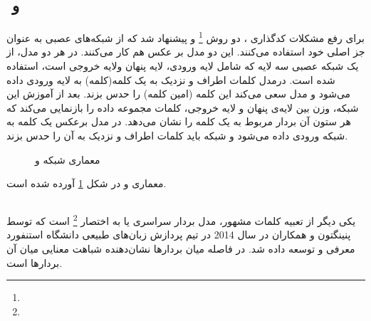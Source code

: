 \subsection{‌ و }
	برای رفع مشکلات کدگذاری 
	، دو روش
	\footnote{}
	\cite{mikolov2013efficient}
	و
	\cite{mikolov2013efficient}
	پیشنهاد شد که از شبکه‌های عصبی به عنوان جز اصلی خود استفاده می‌کنند. این دو مدل بر عکس هم کار می‌کنند.	در هر دو مدل، از یک شبکه عصبی سه لایه که شامل لایه ورودی، لایه پنهان ولایه خروجی است، استفاده شده است. درمدل 
	کلمات اطراف و نزدیک به یک کلمه(کلمه) به لایه ورودی داده می‌شود و مدل سعی می‌کند این کلمه (امین کلمه) را حدس بزند.  بعد از آموزش این شبکه‌، وزن بین لایه‌ی پنهان و لایه خروجی، کلمات مجموعه داده را بازنمایی می‌کند که هر ستون آن بردار مربوط به یک کلمه را نشان می‌دهد. در مدل
	برعکس 
	یک کلمه به شبکه ورودی داده می‌شود و شبکه باید کلمات اطراف و نزدیک به آن را حدس بزند. 
	\begin{figure}
		\caption{
			معماری شبکه 
			و
		}
		\label{fig:CBOW&skip-gram}
	\end{figure}
	معماری 
	و
	در شکل 
	\ref{fig:CBOW&skip-gram}
	آورده شده است. 

\subsection{}
	یکی دیگر از تعبیه کلمات مشهور، مدل بردار سراسری یا به اختصار 
	\footnote{}
	است که توسط پنینگتون و همکاران 
	\cite{pennington2014glove}
	در سال 2014 در تیم پردازش زبان‌های طبیعی دانشگاه استنفورد معرفی و توسعه داده شد. در 
	فاصله میان بردار‌ها نشان‌دهنده شباهت معنایی میان آن بردارها است.
	
